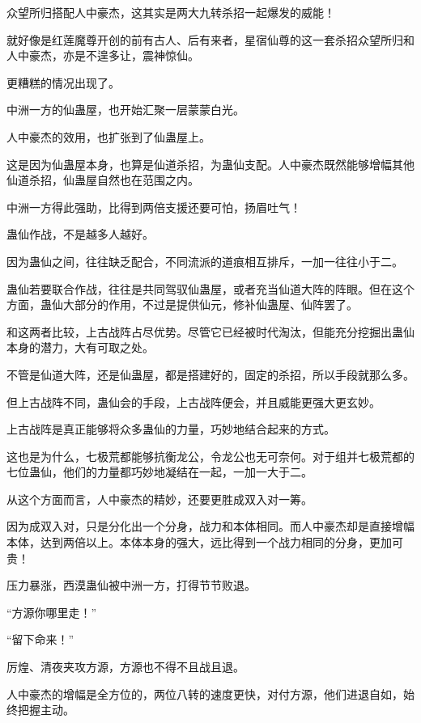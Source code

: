 \begin{this_body}
众望所归搭配人中豪杰，这其实是两大九转杀招一起爆发的威能！

就好像是红莲魔尊开创的前有古人、后有来者，星宿仙尊的这一套杀招众望所归和人中豪杰，亦是不遑多让，震神惊仙。

更糟糕的情况出现了。

中洲一方的仙蛊屋，也开始汇聚一层蒙蒙白光。

人中豪杰的效用，也扩张到了仙蛊屋上。

这是因为仙蛊屋本身，也算是仙道杀招，为蛊仙支配。人中豪杰既然能够增幅其他仙道杀招，仙蛊屋自然也在范围之内。

中洲一方得此强助，比得到两倍支援还要可怕，扬眉吐气！

蛊仙作战，不是越多人越好。

因为蛊仙之间，往往缺乏配合，不同流派的道痕相互排斥，一加一往往小于二。

蛊仙若要联合作战，往往是共同驾驭仙蛊屋，或者充当仙道大阵的阵眼。但在这个方面，蛊仙大部分的作用，不过是提供仙元，修补仙蛊屋、仙阵罢了。

和这两者比较，上古战阵占尽优势。尽管它已经被时代淘汰，但能充分挖掘出蛊仙本身的潜力，大有可取之处。

不管是仙道大阵，还是仙蛊屋，都是搭建好的，固定的杀招，所以手段就那么多。

但上古战阵不同，蛊仙会的手段，上古战阵便会，并且威能更强大更玄妙。

上古战阵是真正能够将众多蛊仙的力量，巧妙地结合起来的方式。

这也是为什么，七极荒都能够抗衡龙公，令龙公也无可奈何。对于组并七极荒都的七位蛊仙，他们的力量都巧妙地凝结在一起，一加一大于二。

从这个方面而言，人中豪杰的精妙，还要更胜成双入对一筹。

因为成双入对，只是分化出一个分身，战力和本体相同。而人中豪杰却是直接增幅本体，达到两倍以上。本体本身的强大，远比得到一个战力相同的分身，更加可贵！

压力暴涨，西漠蛊仙被中洲一方，打得节节败退。

“方源你哪里走！”

“留下命来！”

厉煌、清夜夹攻方源，方源也不得不且战且退。

人中豪杰的增幅是全方位的，两位八转的速度更快，对付方源，他们进退自如，始终把握主动。

\end{this_body}

